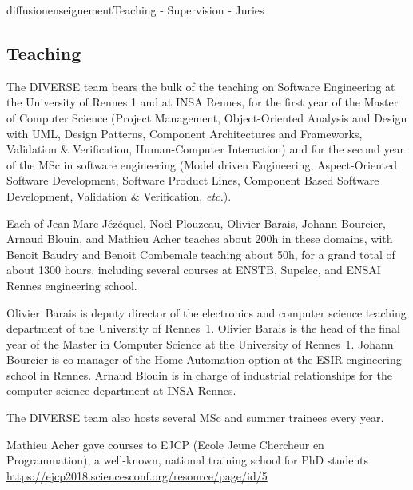 \documentclass{ra2018}
\newcommand{\team}{DIVERSE}
\begin{document}
\begin{module}{diffusion}{enseignement}{Teaching - Supervision - Juries}

\subsection {Teaching}


 The \team{} team bears the bulk of the teaching on Software Engineering at the 
 University of Rennes 1 and at INSA Rennes, for the first year of the Master of Computer Science
 (Project Management, Object-Oriented Analysis and Design with UML, Design Patterns, 
 Component Architectures and Frameworks, Validation \& Verification, Human-Computer Interaction) 
 and for the second year of the MSc in software engineering (Model driven Engineering, Aspect-Oriented Software Development, 
 Software Product Lines, Component Based Software Development, Validation \& Verification, \textit{etc.}). 
 
 Each of Jean-Marc J\'{e}z\'{e}quel, No\"el Plouzeau, Olivier Barais, Johann Bourcier, 
 Arnaud Blouin, and Mathieu Acher teaches about 200h in these domains, 
 with Benoit Baudry and Benoit Combemale teaching about 50h, 
 for a grand total of about 1300 hours, including several courses at ENSTB, Supelec, 
 and ENSAI Rennes engineering school.
 
Olivier~Barais is deputy director of the electronics and computer science teaching department of the University of Rennes~1.
Olivier Barais is the head of the final year of the Master in Computer Science at the University of Rennes~1.
Johann Bourcier is co-manager of the Home-Automation option at the ESIR engineering school in Rennes.
Arnaud Blouin is in charge of industrial relationships for the computer science department at INSA Rennes.
 
 The \team{} team also hosts several MSc and summer trainees every year.
 
Mathieu Acher gave courses to EJCP (Ecole Jeune Chercheur en Programmation), a well-known, national training school for PhD students \url{https://ejcp2018.sciencesconf.org/resource/page/id/5}


%


\end{module}
\end{document}
